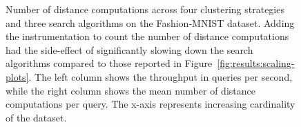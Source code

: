 \begin{figure}
\begin{subfigure}[b]{0.94\textwidth}
        \label{fig:results:counts-legend}
    \end{subfigure}%
    \caption{Number of distance computations across four clustering strategies and three search algorithms on the Fashion-MNIST dataset.
    Adding the instrumentation to count the number of distance computations had the side-effect of significantly slowing down the search algorithms compared to those reported in Figure~\ref{fig:results:scaling-plots}.
    The left column shows the throughput in queries per second, while the right column shows the mean number of distance computations per query.
    The x-axis represents increasing cardinality of the dataset.}
    \label{fig:results:distance-counts}
\end{figure}
